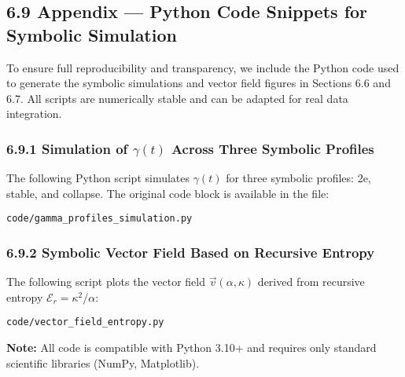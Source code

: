 \subsection*{6.9 Appendix — Python Code Snippets for Symbolic Simulation}

To ensure full reproducibility and transparency, we include the Python code used to generate the symbolic simulations and vector field figures in Sections 6.6 and 6.7. All scripts are numerically stable and can be adapted for real data integration.

\subsubsection*{6.9.1 Simulation of $\gamma(t)$ Across Three Symbolic Profiles}

The following Python script simulates $\gamma(t)$ for three symbolic profiles: 2e, stable, and collapse. The original code block is available in the file:

\texttt{code/gamma_profiles_simulation.py}



\subsubsection*{6.9.2 Symbolic Vector Field Based on Recursive Entropy}

The following script plots the vector field $\vec{v}(\alpha, \kappa)$ derived from recursive entropy $\mathcal{E}_r = \kappa^2 / \alpha$:

\texttt{code/vector_field_entropy.py}



\bigskip
\noindent
\textbf{Note:} All code is compatible with Python 3.10+ and requires only standard scientific libraries (NumPy, Matplotlib).
